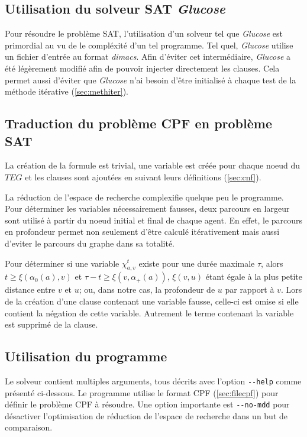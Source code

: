 \documentclass[french, 12pt, letterpaper]{article}
\theoremstyle{definition}
\theoremstyle{proposition}
\theoremstyle{example}
\begin{document}
    \subsection{Utilisation du solveur SAT \emph{Glucose}}
    \label{sec:satsolver}

    Pour résoudre le problème SAT, l'utilisation d'un solveur tel que \emph{Glucose} est primordial au vu de le compléxité d'un tel programme.
    Tel quel, \emph{Glucose} utilise un fichier d'entrée au format \emph{dimacs}.
    Afin d'éviter cet intermédiaire, \emph{Glucose} a été 
    légèrement modifié afin de pouvoir injecter directement les clauses.
    Cela permet aussi d'éviter que \emph{Glucose} n'ai besoin d'être initialisé à chaque test de la méthode itérative (\ref{sec:methiter}).

    \subsection{Traduction du problème CPF en problème SAT}

    La création de la formule est trivial, une variable est créée pour chaque noeud du $TEG$ et les clauses sont ajoutées en
    suivant leurs définitions (\ref{sec:cnf}).

    La réduction de l'espace de recherche complexifie quelque peu le programme. 
    Pour déterminer les variables nécessairement fausses, deux parcours en largeur sont utilisé à partir
    du noeud initial et final de chaque agent.
    En effet, le parcours en profondeur permet non seulement d'être calculé itérativement mais aussi d'eviter le parcours du graphe dans sa totalité.

    Pour déterminer si une variable $\chi^t_{a, v}$ existe pour une durée maximale $\tau$, alors $t \ge \xi(\alpha_0(a), v)$ et
    $\tau - t \ge \xi(v, \alpha_+(a))$, $\xi(v, u)$ étant égale à la plus petite distance entre $v$ et $u$; ou, dans notre cas,
    la profondeur de $u$  par rapport à $v$. 
    Lors de la création d'une clause contenant une variable fausse, celle-ci est omise si elle contient la négation de cette variable.
    Autrement le terme contenant la variable est supprimé de la clause.


    \subsection{Utilisation du programme}

    Le solveur contient multiples arguments, tous décrits avec l'option \lstinline{--help} comme présenté ci-dessous.
    Le programme utilise le format CPF (\ref{sec:filecpf}) pour définir le problème CPF à résoudre. 
    Une option importante est \lstinline{--no-mdd} pour désactiver l'optimisation de réduction de l'espace de recherche dans un but de 
    comparaison. 
    
\end{document}
